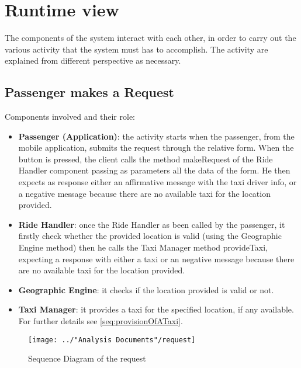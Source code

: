\section{Runtime view}
The components of the system interact with each other, in order to carry out the various activity that the system must has to accomplish.
The activity are explained from different perspective as necessary.

\subsection{Passenger makes a Request} \label{seq:passengerMakesRequest}
Components involved and their role:
\begin{itemize}
	\item \textbf{Passenger (Application)}: the activity starts when the passenger, from the mobile application, submits the request through the relative form. When the button is pressed, the client calls the method makeRequest of the Ride Handler component passing as parameters all the data of the form. He then expects as response either an affirmative message with the taxi driver info, or a negative message because there are no available taxi for the location provided.
	\item \textbf{Ride Handler}: once the Ride Handler as been called by the passenger, it firstly check whether the provided location is valid (using the Geographic Engine method) then he calls the Taxi Manager method provideTaxi, expecting a response with either a taxi or an negative message because there are no available taxi for the location provided.
	\item \textbf{Geographic Engine}: it checks if the location provided is valid or not.
	\item \textbf{Taxi Manager}: it provides a taxi for the specified location, if any available. For further details see \ref{seq:provisionOfATaxi}.
\end{itemize}
\begin{figure}[H]
	\centering
	\texttt{[image: ../"Analysis Documents"/request]}
	\label{fig:request_seq}
	\caption{Sequence Diagram of the request}
\end{figure}

